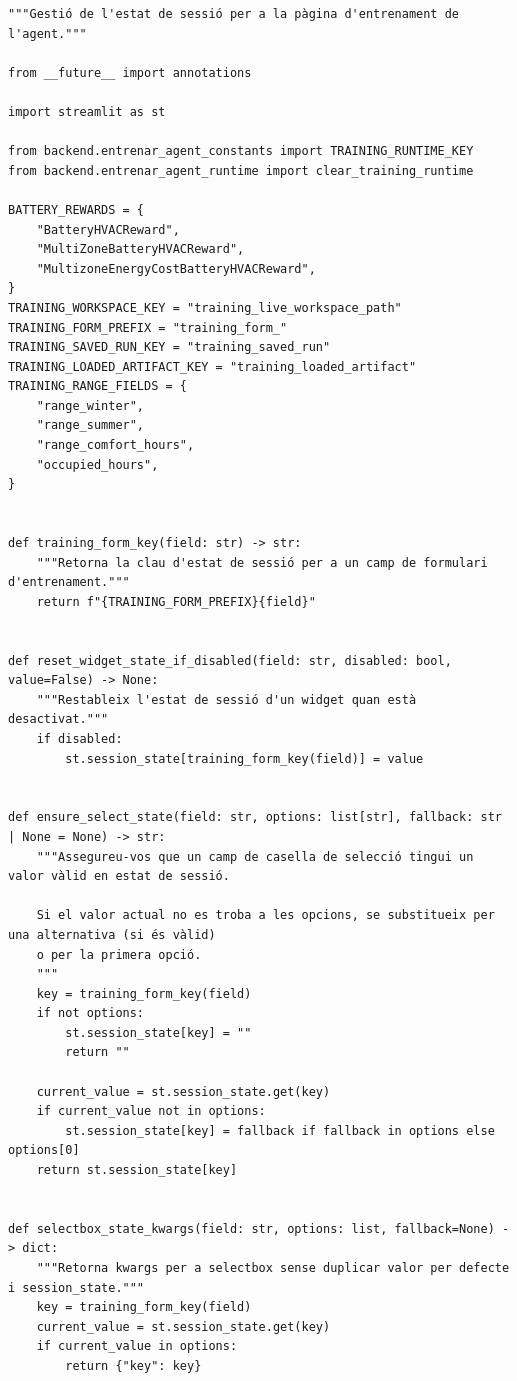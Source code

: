 \documentclass[10pt,a4paper]{article}
\begin{document}
\begin{lstlisting}[style=studioPython,caption={backend/entrenar\_agent\_session.py},label={lst:backend-entrenar-agent-session-py}]
"""Gestió de l'estat de sessió per a la pàgina d'entrenament de l'agent."""

from __future__ import annotations

import streamlit as st

from backend.entrenar_agent_constants import TRAINING_RUNTIME_KEY
from backend.entrenar_agent_runtime import clear_training_runtime

BATTERY_REWARDS = {
    "BatteryHVACReward",
    "MultiZoneBatteryHVACReward",
    "MultizoneEnergyCostBatteryHVACReward",
}
TRAINING_WORKSPACE_KEY = "training_live_workspace_path"
TRAINING_FORM_PREFIX = "training_form_"
TRAINING_SAVED_RUN_KEY = "training_saved_run"
TRAINING_LOADED_ARTIFACT_KEY = "training_loaded_artifact"
TRAINING_RANGE_FIELDS = {
    "range_winter",
    "range_summer",
    "range_comfort_hours",
    "occupied_hours",
}


def training_form_key(field: str) -> str:
    """Retorna la clau d'estat de sessió per a un camp de formulari d'entrenament."""
    return f"{TRAINING_FORM_PREFIX}{field}"


def reset_widget_state_if_disabled(field: str, disabled: bool, value=False) -> None:
    """Restableix l'estat de sessió d'un widget quan està desactivat."""
    if disabled:
        st.session_state[training_form_key(field)] = value


def ensure_select_state(field: str, options: list[str], fallback: str | None = None) -> str:
    """Assegureu-vos que un camp de casella de selecció tingui un valor vàlid en estat de sessió.

    Si el valor actual no es troba a les opcions, se substitueix per una alternativa (si és vàlid)
    o per la primera opció.
    """
    key = training_form_key(field)
    if not options:
        st.session_state[key] = ""
        return ""

    current_value = st.session_state.get(key)
    if current_value not in options:
        st.session_state[key] = fallback if fallback in options else options[0]
    return st.session_state[key]


def selectbox_state_kwargs(field: str, options: list, fallback=None) -> dict:
    """Retorna kwargs per a selectbox sense duplicar valor per defecte i session_state."""
    key = training_form_key(field)
    current_value = st.session_state.get(key)
    if current_value in options:
        return {"key": key}


\end{lstlisting}
\end{document}
